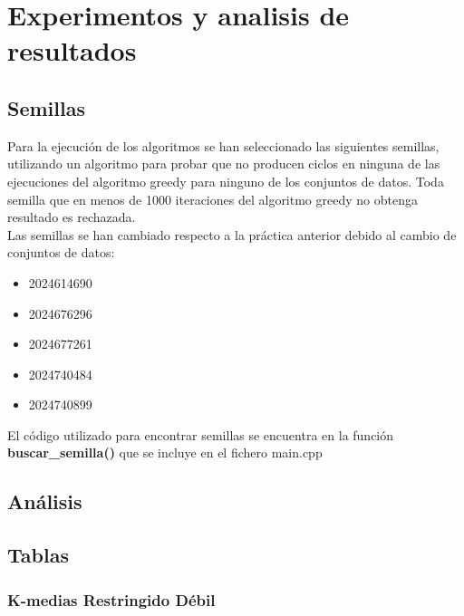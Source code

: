\chapter{Experimentos y analisis de resultados}
\section{Semillas}
Para la ejecución de los algoritmos se han seleccionado las siguientes semillas, utilizando un algoritmo para probar que no producen ciclos en ninguna de las ejecuciones del algoritmo greedy para ninguno de los conjuntos de datos. Toda semilla que en menos de 1000 iteraciones del algoritmo greedy no obtenga resultado es rechazada. \\
Las semillas se han cambiado respecto a la práctica anterior debido al cambio de conjuntos de datos:
\begin{itemize}
   \item 2024614690
   \item 2024676296
   \item 2024677261
   \item 2024740484
   \item 2024740899
\end{itemize}


El código utilizado para encontrar semillas se encuentra en la función \textbf{buscar\_semilla()} que se incluye en el fichero main.cpp


\section{Análisis}

\section{Tablas}

\subsection{K-medias Restringido Débil}
